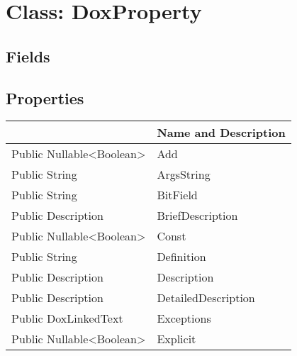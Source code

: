 \documentclass[11pt, oneside, a4paper]{book}
\begin{document}
\hypertarget{SoftwareEngineeringTools.{}Documentation.{}DoxProperty}{}
\section{Class: DoxProperty}

\subsection{Fields}

\subsection{Properties}
\begin{center}
\begin{tabular}{| p{3cm} | p{12cm} | }
\hline
\textbf{ } & \textbf{ Name and Description}\\
\hline
 Public  Nullable<Boolean> &  Add\hypertarget{SoftwareEngineeringTools.{}Documentation.{}DoxProperty.{}Add}{}\\
\hline
 Public  String &  ArgsString\hypertarget{SoftwareEngineeringTools.{}Documentation.{}DoxProperty.{}ArgsString}{}\\
\hline
 Public  String &  BitField\hypertarget{SoftwareEngineeringTools.{}Documentation.{}DoxProperty.{}BitField}{}\\
\hline
 Public  Description &  BriefDescription\hypertarget{SoftwareEngineeringTools.{}Documentation.{}DoxProperty.{}BriefDescription}{}\\
\hline
 Public  Nullable<Boolean> &  Const\hypertarget{SoftwareEngineeringTools.{}Documentation.{}DoxProperty.{}Const}{}\\
\hline
 Public  String &  Definition\hypertarget{SoftwareEngineeringTools.{}Documentation.{}DoxProperty.{}Definition}{}\\
\hline
 Public  Description &  Description\hypertarget{SoftwareEngineeringTools.{}Documentation.{}DoxProperty.{}Description}{}\\
\hline
 Public  Description &  DetailedDescription\hypertarget{SoftwareEngineeringTools.{}Documentation.{}DoxProperty.{}DetailedDescription}{}\\
\hline
 Public  DoxLinkedText &  Exceptions\hypertarget{SoftwareEngineeringTools.{}Documentation.{}DoxProperty.{}Exceptions}{}\\
\hline
 Public  Nullable<Boolean> &  Explicit\hypertarget{SoftwareEngineeringTools.{}Documentation.{}DoxProperty.{}Explicit}{}\\

\end{tabular}
\end{center}
\end{document}
